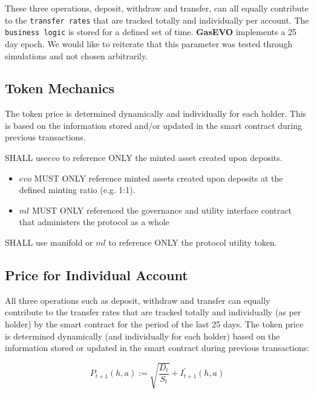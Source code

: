 These three operations, deposit, withdraw and transfer,  can all equally contribute to
the \texttt{transfer rates} that are tracked totally and individually per account. The \texttt{business logic} is stored for a defined set of time. \textbf{GasEVO} implements a 25 day epoch. We would like to reiterate that this parameter was tested through simulations and not chosen arbitrarily. 

\subsection{Token Mechanics}
The token price is determined dynamically and individually for each holder. This is based on the
information stored and/or updated in the smart contract during previous transactions. 

SHALL use$ evo$ to reference ONLY the minted asset created upon deposits.
\linebreak

\begin{itemize}
	\item $evo$ MUST ONLY reference minted assets created upon deposits at the defined minting ratio (e.g. 1:1).
	\item $ml$ MUST ONLY referenced the governance and utility interface contract that administers the protocol as a whole
\end{itemize}

SHALL use  manifold  or $ml$ to reference ONLY the protocol utility token.

\newpage
\subsection{Price for Individual Account} 
All three operations such as deposit, withdraw and transfer can equally contribute to the transfer rates that are tracked totally and individually (as per holder)
by the smart contract for the period of the last 25 days. The token price is determined dynamically (and individually for each holder) based on the information stored or updated in the smart contract during previous transactions:

\begin{tcolorbox}
	\label{eq:Base Primitive Equation}
	
	
	\begin{equation}
		P_{t+1}(h, a):=\sqrt{\frac{D_{t}}{S_{t}}}+I_{t+1}^{\prime}(h, a)
	\end{equation}
	
\end{tcolorbox}

